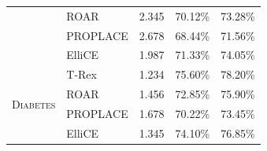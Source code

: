 \begin{table}[t]
{\begin{tabular}{llccc}
& \cellcolor{frappegreen!45} ROAR
& \cellcolor{frappegreen!45} 2.345
& \cellcolor{frappegreen!45} 70.12\%
& \cellcolor{frappegreen!45} 73.28\% \\

& \cellcolor{frappegreen!51} PROPLACE
& \cellcolor{frappegreen!51} 2.678
& \cellcolor{frappegreen!51} 68.44\%
& \cellcolor{frappegreen!51} 71.56\% \\

& \cellcolor{frappegreen!18} ElliCE
& \cellcolor{frappegreen!18} 1.987
& \cellcolor{frappegreen!18} 71.33\%
& \cellcolor{frappegreen!18} 74.05\% \\
\midrule

\multirow{4}{*}{\textsc{Diabetes}}
& \cellcolor{frappegreen!8} T-Rex
& \cellcolor{frappegreen!8} 1.234
& \cellcolor{frappegreen!8} 75.60\%
& \cellcolor{frappegreen!8} 78.20\% \\

& \cellcolor{frappegreen!45} ROAR
& \cellcolor{frappegreen!45} 1.456
& \cellcolor{frappegreen!45} 72.85\%
& \cellcolor{frappegreen!45} 75.90\% \\

& \cellcolor{frappegreen!60} PROPLACE
& \cellcolor{frappegreen!60} 1.678
& \cellcolor{frappegreen!60} 70.22\%
& \cellcolor{frappegreen!60} 73.45\% \\

& \cellcolor{frappegreen!21} ElliCE
& \cellcolor{frappegreen!21} 1.345
& \cellcolor{frappegreen!21} 74.10\%
& \cellcolor{frappegreen!21} 76.85\% \\
\bottomrule
\end{tabular}
}
\end{table}





